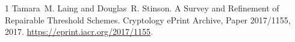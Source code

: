 \documentclass[11pt]{article}
\newcommand{\?}[1]{\stackrel{?}{#1}}
\begin{document}
\begin{description}
\end{description}

\begin{thebibliography}{1}
Tamara~M. Laing and Douglas~R. Stinson.
\newblock A Survey and Refinement of Repairable Threshold Schemes.
\newblock Cryptology ePrint Archive, Paper 2017/1155, 2017.
\newblock \url{https://eprint.iacr.org/2017/1155}.
\end{thebibliography}
\end{document}
